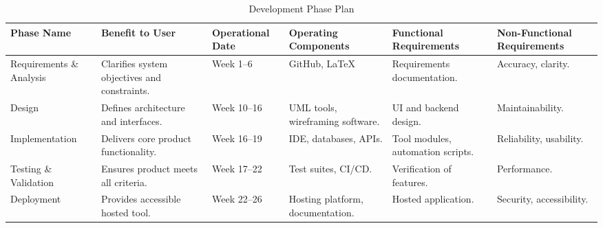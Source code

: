 \documentclass[12pt]{article}
\newcommand{\lips}{\textit{Insert your content here.}}
\begin{document}
\begin{table}[H]
\centering
\caption{Development Phase Plan}
\setlength{\tabcolsep}{4pt}
\renewcommand{\arraystretch}{1.2}
\footnotesize

\begin{tabularx}{\textwidth}{p{2.5cm} Y p{2cm} Y Y Y}
\toprule
\textbf{Phase Name} & \textbf{Benefit to User} & \textbf{Operational Date} &
\textbf{Operating Components} & \textbf{Functional Requirements} &
\textbf{Non-Functional Requirements} \\
\midrule
{}

Requirements \& Analysis &
Clarifies system objectives and constraints. &
Week 1–6 &
GitHub, LaTeX &
Requirements documentation. &
Accuracy, clarity. \\
\hline
Design &
Defines architecture and interfaces. &
Week 10–16 &
UML tools, wireframing software. &
UI and backend design. &
Maintainability. \\
\hline
Implementation &
Delivers core product functionality. &
Week 16–19 &
IDE, databases, APIs. &
Tool modules, automation scripts. &
Reliability, usability. \\
\hline
Testing \& Validation &
Ensures product meets all criteria. &
Week 17–22 &
Test suites, CI/CD. &
Verification of features. &
Performance. \\
\hline
Deployment &
Provides accessible hosted tool. &
Week 22–26 &
Hosting platform, documentation. &
Hosted application. &
Security, accessibility. \\
\bottomrule
\end{tabularx}
\end{table}



\end{document}
